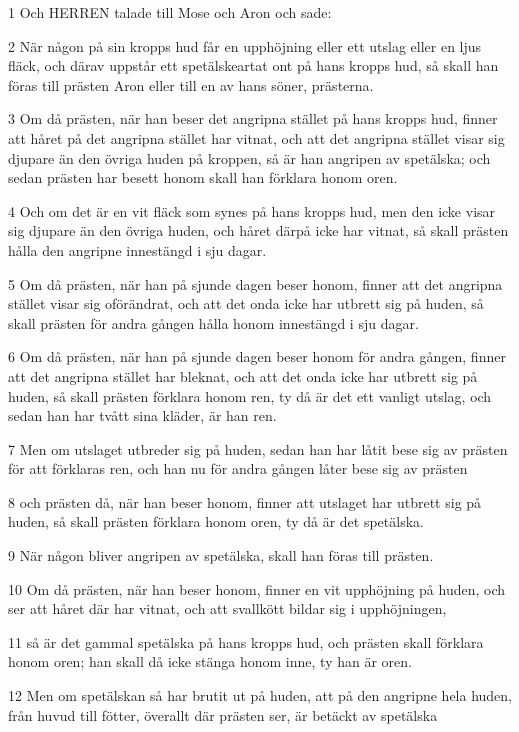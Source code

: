\par 1 Och HERREN talade till Mose och Aron och sade:
\par 2 När någon på sin kropps hud får en upphöjning eller ett utslag eller en ljus fläck, och därav uppstår ett spetälskeartat ont på hans kropps hud, så skall han föras till prästen Aron eller till en av hans söner, prästerna.
\par 3 Om då prästen, när han beser det angripna stället på hans kropps hud, finner att håret på det angripna stället har vitnat, och att det angripna stället visar sig djupare än den övriga huden på kroppen, så är han angripen av spetälska; och sedan prästen har besett honom skall han förklara honom oren.
\par 4 Och om det är en vit fläck som synes på hans kropps hud, men den icke visar sig djupare än den övriga huden, och håret därpå icke har vitnat, så skall prästen hålla den angripne innestängd i sju dagar.
\par 5 Om då prästen, när han på sjunde dagen beser honom, finner att det angripna stället visar sig oförändrat, och att det onda icke har utbrett sig på huden, så skall prästen för andra gången hålla honom innestängd i sju dagar.
\par 6 Om då prästen, när han på sjunde dagen beser honom för andra gången, finner att det angripna stället har bleknat, och att det onda icke har utbrett sig på huden, så skall prästen förklara honom ren, ty då är det ett vanligt utslag, och sedan han har tvått sina kläder, är han ren.
\par 7 Men om utslaget utbreder sig på huden, sedan han har låtit bese sig av prästen för att förklaras ren, och han nu för andra gången låter bese sig av prästen
\par 8 och prästen då, när han beser honom, finner att utslaget har utbrett sig på huden, så skall prästen förklara honom oren, ty då är det spetälska.
\par 9 När någon bliver angripen av spetälska, skall han föras till prästen.
\par 10 Om då prästen, när han beser honom, finner en vit upphöjning på huden, och ser att håret där har vitnat, och att svallkött bildar sig i upphöjningen,
\par 11 så är det gammal spetälska på hans kropps hud, och prästen skall förklara honom oren; han skall då icke stänga honom inne, ty han är oren.
\par 12 Men om spetälskan så har brutit ut på huden, att på den angripne hela huden, från huvud till fötter, överallt där prästen ser, är betäckt av spetälska
